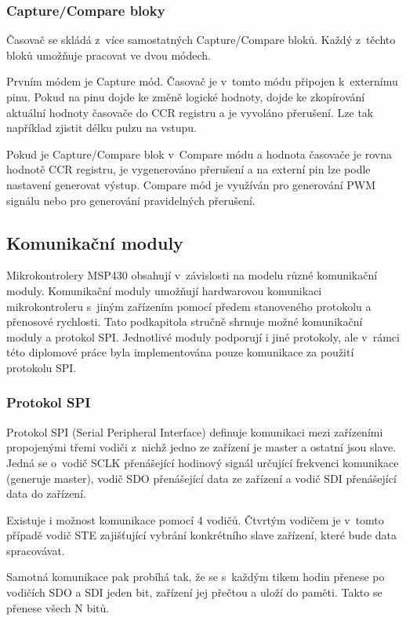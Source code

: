 \subsubsection{Capture/Compare bloky}

Časovač se skládá z~více samostatných Capture/Compare bloků. Každý z~těchto bloků umožňuje pracovat ve dvou módech.

Prvním módem je Capture mód. Časovač je v~tomto módu připojen k~externímu pinu. Pokud na pinu dojde ke změně logické hodnoty, dojde ke zkopírování aktuální hodnoty časovače do CCR registru a je vyvoláno přerušení. Lze tak například zjistit délku pulzu na vstupu.

Pokud je Capture/Compare blok v~Compare módu a hodnota časovače je rovna hodnotě CCR registru, je vygenerováno přerušení a na externí pin lze podle nastavení generovat výstup. Compare mód je využíván pro generování PWM signálu nebo pro generování pravidelných přerušení.

\subsection{Komunikační moduly}

Mikrokontrolery MSP430 obsahují v~závislosti na modelu různé komunikační moduly. Komunikační moduly umožňují hardwarovou komunikaci mikrokontroleru s~jiným zařízením pomocí předem stanoveného protokolu a přenosové rychlosti. Tato podkapitola stručně shrnuje možné komunikační moduly a protokol SPI. Jednotlivé moduly podporují i jiné protokoly, ale v~rámci této diplomové práce byla implementována pouze komunikace za použití protokolu SPI.

\subsubsection{Protokol SPI}

Protokol SPI (Serial Peripheral Interface) definuje komunikaci mezi zařízeními propojenými třemi vodiči z~nichž jedno ze zařízení je master a ostatní jsou slave. Jedná se o~vodič SCLK přenášející hodinový signál určující frekvenci komunikace (generuje master), vodič SDO přenášející data ze zařízení a vodič SDI přenášející data do zařízení.

Existuje i možnost komunikace pomocí 4 vodičů. Čtvrtým vodičem je v~tomto případě vodič STE zajišťující vybrání konkrétního slave zařízení, které bude data spracovávat.

Samotná komunikace pak probíhá tak, že se s~každým tikem hodin přenese po vodičích SDO a SDI jeden bit, zařízení jej přečtou a uloží do paměti. Takto se přenese všech N bitů.

